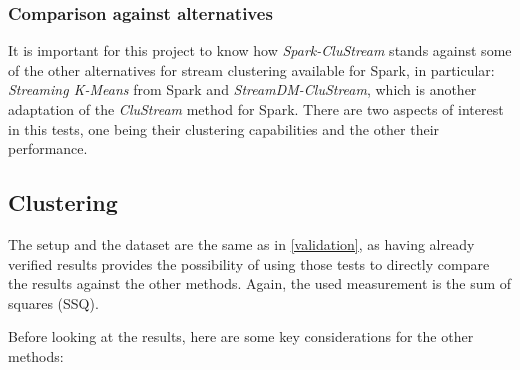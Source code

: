 \subsubsection{Comparison against alternatives}

It is important for this project to know how \textit{Spark-CluStream} stands against some of the other alternatives for stream clustering available for Spark, in particular: \textit{Streaming K-Means} from Spark and \textit{StreamDM-CluStream}, which is another adaptation of the \textit{CluStream} method for Spark. There are two aspects of interest in this tests, one being their clustering capabilities and the other their performance.

\subsection{Clustering}

The setup and the dataset are the same as in \ref{validation}, as having already verified results provides the possibility of using those tests to directly compare the results against the other methods. Again, the used measurement is the sum of squares (SSQ).

Before looking at the results, here are some key considerations for the other methods:

